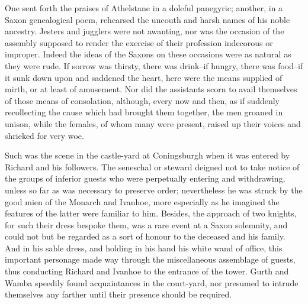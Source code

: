 One sent forth the praises of Athelstane in a doleful panegyric;
another, in a Saxon genealogical poem, rehearsed the uncouth and harsh
names of his noble ancestry. Jesters and jugglers were not awanting, nor
was the occasion of the assembly supposed to render the exercise of
their profession indecorous or improper. Indeed the ideas of the Saxons
on these occasions were as natural as they were rude. If sorrow was
thirsty, there was drink--if hungry, there was food--if it sunk down
upon and saddened the heart, here were the means supplied of mirth, or
at least of amusement. Nor did the assistants scorn to avail themselves
of those means of consolation, although, every now and then, as if
suddenly recollecting the cause which had brought them together, the men
groaned in unison, while the females, of whom many were present, raised
up their voices and shrieked for very woe.

Such was the scene in the castle-yard at Coningsburgh when it was
entered by Richard and his followers. The seneschal or steward deigned
not to take notice of the groups of inferior guests who were perpetually
entering and withdrawing, unless so far as was necessary to preserve
order; nevertheless he was struck by the good mien of the Monarch and
Ivanhoe, more especially as he imagined the features of the latter were
familiar to him. Besides, the approach of two knights, for such their
dress bespoke them, was a rare event at a Saxon solemnity, and could not
but be regarded as a sort of honour to the deceased and his family. And
in his sable dress, and holding in his hand his white wand of office,
this important personage made way through the miscellaneous assemblage
of guests, thus conducting Richard and Ivanhoe to the entrance of the
tower. Gurth and Wamba speedily found acquaintances in the court-yard,
nor presumed to intrude themselves any farther until their presence
should be required.
